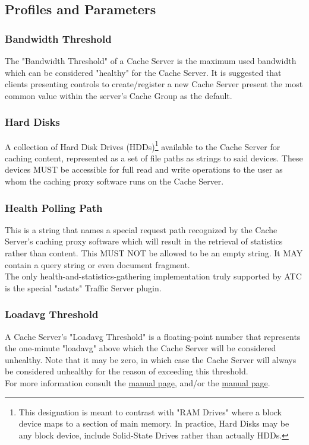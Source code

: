 \subsection{Profiles and Parameters}


\subsubsection{Bandwidth Threshold}
The "Bandwidth Threshold" of a Cache Server is the maximum used bandwidth which
can be considered "healthy" for the Cache Server. It is suggested that clients
presenting controls to create/register a new Cache Server present the most
common value within the server's Cache Group as the default.

\subsubsection{Hard Disks}
A collection of Hard Disk Drives (HDDs)\footnote{This designation is meant to
contrast with "RAM Drives" where a block device maps to a section of main
memory. In practice, Hard Disks may be any block device, include Solid-State
Drives rather than actually HDDs.} available to the Cache Server for caching
content, represented as a set of file paths as strings to said devices. These
devices MUST be accessible for full read and write operations to the user as
whom the caching proxy software runs on the Cache Server.

\subsubsection{Health Polling Path}
This is a string that names a special request path recognized by the Cache
Server's caching proxy software which will result in the retrieval of statistics
rather than content. This MUST NOT be allowed to be an empty string. It MAY
contain a query string or even document fragment.\\
The only health-and-statistics-gathering implementation truly supported by ATC
is the special "astats" Traffic Server plugin.

\subsubsection{Loadavg Threshold}
A Cache Server's "Loadavg Threshold" is a floating-point number that represents
the one-minute "loadavg" above which the Cache Server will be considered
unhealthy. Note that it may be zero, in which case the Cache Server will always
be considered unhealthy for the reason of exceeding this threshold.\\
For more information consult the
\href{https://linux.die.net/man/3/getloadavg}{ manual page},
and/or the
\href{https://linux.die.net/man/5/proc}{ manual page}.

